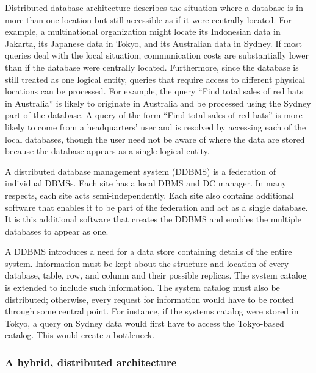 \documentclass[
]{article}
\begin{document}
Distributed database architecture describes the situation where a
database is in more than one location but still accessible as if it were
centrally located. For example, a multinational organization might
locate its Indonesian data in Jakarta, its Japanese data in Tokyo, and
its Australian data in Sydney. If most queries deal with the local
situation, communication costs are substantially lower than if the
database were centrally located. Furthermore, since the database is
still treated as one logical entity, queries that require access to
different physical locations can be processed. For example, the query
``Find total sales of red hats in Australia'' is likely to originate in
Australia and be processed using the Sydney part of the database. A
query of the form ``Find total sales of red hats'' is more likely to come
from a headquarters' user and is resolved by accessing each of the local
databases, though the user need not be aware of where the data are
stored because the database appears as a single logical entity.

A distributed database management system (DDBMS) is a federation of
individual DBMSs. Each site has a local DBMS and DC manager. In many
respects, each site acts semi-independently. Each site also contains
additional software that enables it to be part of the federation and act
as a single database. It is this additional software that creates the
DDBMS and enables the multiple databases to appear as one.

A DDBMS introduces a need for a data store containing details of the
entire system. Information must be kept about the structure and location
of every database, table, row, and column and their possible replicas.
The system catalog is extended to include such information. The system
catalog must also be distributed; otherwise, every request for
information would have to be routed through some central point. For
instance, if the systems catalog were stored in Tokyo, a query on Sydney
data would first have to access the Tokyo-based catalog. This would
create a bottleneck.

\hypertarget{a-hybrid-distributed-architecture}{%
\subsubsection*{A hybrid, distributed architecture}\label{a-hybrid-distributed-architecture}}
\end{document}
